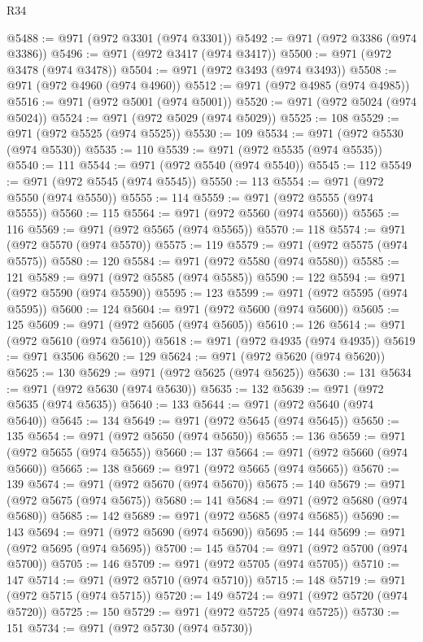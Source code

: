 \begin{lexlean}{R34}
\begin{coremodule}
@5488 := @971 (@972 @3301 (@974 @3301))
@5492 := @971 (@972 @3386 (@974 @3386))
@5496 := @971 (@972 @3417 (@974 @3417))
@5500 := @971 (@972 @3478 (@974 @3478))
@5504 := @971 (@972 @3493 (@974 @3493))
@5508 := @971 (@972 @4960 (@974 @4960))
@5512 := @971 (@972 @4985 (@974 @4985))
@5516 := @971 (@972 @5001 (@974 @5001))
@5520 := @971 (@972 @5024 (@974 @5024))
@5524 := @971 (@972 @5029 (@974 @5029))
@5525 := 108
@5529 := @971 (@972 @5525 (@974 @5525))
@5530 := 109
@5534 := @971 (@972 @5530 (@974 @5530))
@5535 := 110
@5539 := @971 (@972 @5535 (@974 @5535))
@5540 := 111
@5544 := @971 (@972 @5540 (@974 @5540))
@5545 := 112
@5549 := @971 (@972 @5545 (@974 @5545))
@5550 := 113
@5554 := @971 (@972 @5550 (@974 @5550))
@5555 := 114
@5559 := @971 (@972 @5555 (@974 @5555))
@5560 := 115
@5564 := @971 (@972 @5560 (@974 @5560))
@5565 := 116
@5569 := @971 (@972 @5565 (@974 @5565))
@5570 := 118
@5574 := @971 (@972 @5570 (@974 @5570))
@5575 := 119
@5579 := @971 (@972 @5575 (@974 @5575))
@5580 := 120
@5584 := @971 (@972 @5580 (@974 @5580))
@5585 := 121
@5589 := @971 (@972 @5585 (@974 @5585))
@5590 := 122
@5594 := @971 (@972 @5590 (@974 @5590))
@5595 := 123
@5599 := @971 (@972 @5595 (@974 @5595))
@5600 := 124
@5604 := @971 (@972 @5600 (@974 @5600))
@5605 := 125
@5609 := @971 (@972 @5605 (@974 @5605))
@5610 := 126
@5614 := @971 (@972 @5610 (@974 @5610))
@5618 := @971 (@972 @4935 (@974 @4935))
@5619 := @971 @3506
@5620 := 129
@5624 := @971 (@972 @5620 (@974 @5620))
@5625 := 130
@5629 := @971 (@972 @5625 (@974 @5625))
@5630 := 131
@5634 := @971 (@972 @5630 (@974 @5630))
@5635 := 132
@5639 := @971 (@972 @5635 (@974 @5635))
@5640 := 133
@5644 := @971 (@972 @5640 (@974 @5640))
@5645 := 134
@5649 := @971 (@972 @5645 (@974 @5645))
@5650 := 135
@5654 := @971 (@972 @5650 (@974 @5650))
@5655 := 136
@5659 := @971 (@972 @5655 (@974 @5655))
@5660 := 137
@5664 := @971 (@972 @5660 (@974 @5660))
@5665 := 138
@5669 := @971 (@972 @5665 (@974 @5665))
@5670 := 139
@5674 := @971 (@972 @5670 (@974 @5670))
@5675 := 140
@5679 := @971 (@972 @5675 (@974 @5675))
@5680 := 141
@5684 := @971 (@972 @5680 (@974 @5680))
@5685 := 142
@5689 := @971 (@972 @5685 (@974 @5685))
@5690 := 143
@5694 := @971 (@972 @5690 (@974 @5690))
@5695 := 144
@5699 := @971 (@972 @5695 (@974 @5695))
@5700 := 145
@5704 := @971 (@972 @5700 (@974 @5700))
@5705 := 146
@5709 := @971 (@972 @5705 (@974 @5705))
@5710 := 147
@5714 := @971 (@972 @5710 (@974 @5710))
@5715 := 148
@5719 := @971 (@972 @5715 (@974 @5715))
@5720 := 149
@5724 := @971 (@972 @5720 (@974 @5720))
@5725 := 150
@5729 := @971 (@972 @5725 (@974 @5725))
@5730 := 151
@5734 := @971 (@972 @5730 (@974 @5730))

\end{coremodule}
\end{lexlean}
